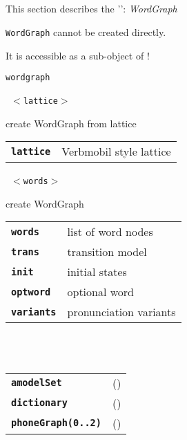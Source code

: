 
\subsection{}

This section describes the '': \textsl{WordGraph}

\begin{description}
\vspace{3mm}  \item[Creation:] \texttt{WordGraph} cannot be created directly.\

It is accessible as a sub-object of !

\vspace{3mm} \item[Methods:] \texttt{wordgraph}

    \begin{description}
       \texttt{ $<$lattice$>$} \

        create WordGraph from lattice

      \begin{tabular}{ll}
 \texttt{\textbf{lattice}} &  Verbmobil style lattice  \\
      \end{tabular}
       \texttt{ $<$words$>$    } \

        create WordGraph

      \begin{tabular}{ll}
 \texttt{\textbf{words}} &    list of word nodes \\
 \texttt{\textbf{trans}} &     transition model  \\
 \texttt{\textbf{init}} &      initial states \\
 \texttt{\textbf{optword}} &   optional word \\
 \texttt{\textbf{variants}} &  pronunciation variants  \\
      \end{tabular}
    \end{description}

  \item[Subobjects:] \hfill \\
\ 
    \begin{tabular}{ll}
      \texttt{\textbf{amodelSet}} & (\Jref{module}{AModelSet}) \\
      \texttt{\textbf{dictionary}} & (\Jref{module}{Dictionary}) \\
      \texttt{\textbf{phoneGraph(0..2)}} & (\Jref{module}{???}) \\
    \end{tabular}
\vspace{3mm}

\end{description}


